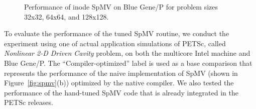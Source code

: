 {\begin{figure}
\begin{center}
{  \label{fig:ex27-bgp-vn-64x64} 
  } 
\end{center}
\vspace{-.2in}
\caption{Performance of inode SpMV on Blue Gene/P for problem sizes 32x32, 64x64, and 128x128.} 
\label{fig:ex27-bgp-results2} 
\end{figure} 
}

To evaluate the performance of the tuned SpMV routine, we conduct the
experiment using one of actual application simulations of PETSc,
called \textit{Nonlinear 2-D Driven Cavity} problem, on both the
multicore Intel machine and Blue Gene/P. The ``Compiler-optimized''
label is used as a base comparison that represents the performance of
the naive implementation of SpMV (shown in Figure~\ref{fig:spmv}(b))
optimized by the native compiler. We also tested the performance of
the hand-tuned SpMV code that is already integrated in the PETSc
releases.

